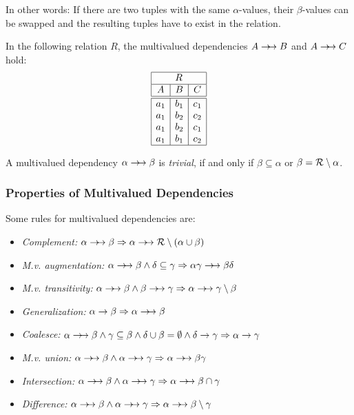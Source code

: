 In other words: If there are two tuples with the same $\alpha$-values, their $\beta$-values can be swapped and the resulting tuples have to exist in the relation.

\begin{example} In the following relation $R$, the multivalued dependencies $A \rightarrow\!\!\rightarrow B$ and $A \rightarrow\!\!\rightarrow C$ hold:
\[ \begin{array}{|c|c|c|}\hline
\multicolumn{3}{|c|}{R} \\\hline
A & B & C \\\hline\hline
a_1 & b_1 & c_1 \\
a_1 & b_2 & c_2 \\
a_1 & b_2 & c_1 \\
a_1 & b_1 & c_2 \\\hline
\end{array} \]
\vspace*{-1em}
\end{example}

A multivalued dependency $\alpha \rightarrow\!\!\rightarrow \beta$ is \emph{trivial}, if and only if $\beta\subseteq\alpha$ or $\beta = \mathcal{R}\setminus\alpha$.




\subsubsection[Properties of MVD]{Properties of Multivalued Dependencies}

Some rules for multivalued dependencies are:
\begin{itemize}
\item \emph{Complement:} $\alpha \rightarrow\!\!\rightarrow \beta \Rightarrow \alpha \rightarrow\!\!\rightarrow \mathcal{R}\setminus (\alpha \cup \beta)$
\item \emph{M.v. augmentation:}	$\alpha\rightarrow\!\!\rightarrow\beta \wedge \delta\subseteq\gamma \Rightarrow \alpha\gamma \rightarrow\!\!\rightarrow \beta\delta$
\item \emph{M.v. transitivity:} $\alpha\rightarrow\!\!\rightarrow\beta \wedge \beta\rightarrow\!\!\rightarrow\gamma \Rightarrow \alpha\rightarrow\!\!\rightarrow\gamma\setminus\beta$
\item \emph{Generalization:} $\alpha\rightarrow\beta \Rightarrow \alpha\rightarrow\!\!\rightarrow\beta$
\item \emph{Coalesce:} $\alpha\rightarrow\!\!\rightarrow\beta \wedge \gamma\subseteq\beta \wedge \delta\cup\beta=\emptyset \wedge \delta\rightarrow\gamma \Rightarrow \alpha\rightarrow \gamma$
\item \emph{M.v. union:} $\alpha\rightarrow\!\!\rightarrow\beta \wedge \alpha \rightarrow\!\!\rightarrow\gamma \Rightarrow \alpha \rightarrow\!\!\rightarrow \beta\gamma$
\item \emph{Intersection:} $\alpha\rightarrow\!\!\rightarrow\beta \wedge \alpha\rightarrow\!\!\rightarrow\gamma \Rightarrow \alpha \rightarrow\!\!\rightarrow \beta \cap \gamma$
\item \emph{Difference:} $\alpha\rightarrow\!\!\rightarrow\beta \wedge \alpha\rightarrow\!\!\rightarrow\gamma \Rightarrow \alpha\rightarrow\!\!\rightarrow\beta\setminus\gamma$
\end{itemize}

